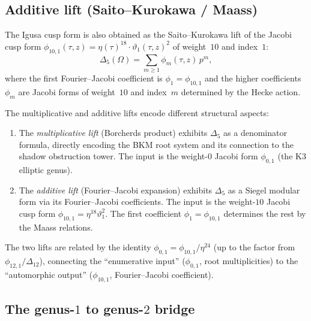 \subsection{Additive lift (Saito--Kurokawa / Maass)}
\label{subsec:k3e-additive-lift}

\begin{theorem}
\label{thm:k3e-additive-lift}
\ClaimStatusProvedElsewhere
The Igusa cusp form is also obtained as the Saito--Kurokawa lift of the Jacobi cusp form $\phi_{10,1}(\tau, z) = \eta(\tau)^{18} \cdot \vartheta_1(\tau, z)^2$ of weight~$10$ and index~$1$:
\[
 \Delta_5(\Omega) = \sum_{m \geq 1} \phi_m(\tau, z) \, p^m,
\]
where the first Fourier--Jacobi coefficient is $\phi_1 = \phi_{10,1}$ and the higher coefficients $\phi_m$ are Jacobi forms of weight~$10$ and index~$m$ determined by the Hecke action.
\ClaimStatusProvedElsewhere
\end{theorem}

\begin{remark}
\label{rem:k3e-two-lifts}
The multiplicative and additive lifts encode different structural aspects:
\begin{enumerate}[label=(\roman*)]
 \item The \emph{multiplicative lift} (Borcherds product) exhibits $\Delta_5$ as a denominator formula, directly encoding the BKM root system and its connection to the shadow obstruction tower. The input is the weight-$0$ Jacobi form $\phi_{0,1}$ (the K3 elliptic genus).
 \item The \emph{additive lift} (Fourier--Jacobi expansion) exhibits $\Delta_5$ as a Siegel modular form via its Fourier--Jacobi coefficients. The input is the weight-$10$ Jacobi cusp form $\phi_{10,1} = \eta^{18} \vartheta_1^2$. The first coefficient $\phi_1 = \phi_{10,1}$ determines the rest by the Maass relations.
\end{enumerate}
The two lifts are related by the identity $\phi_{0,1} = \phi_{10,1} / \eta^{24}$ (up to the factor from $\phi_{12,1} / \Delta_{12}$), connecting the ``enumerative input'' ($\phi_{0,1}$, root multiplicities) to the ``automorphic output'' ($\phi_{10,1}$, Fourier--Jacobi coefficient).
\end{remark}

\subsection{The genus-$1$ to genus-$2$ bridge}
\label{subsec:k3e-genus-bridge}

